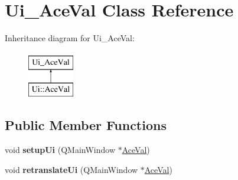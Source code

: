 \hypertarget{classUi__AceVal}{\section{Ui\-\_\-\-Ace\-Val Class Reference}
\label{classUi__AceVal}
}
Inheritance diagram for Ui\-\_\-\-Ace\-Val\-:\begin{figure}[H]
\begin{center}
\leavevmode
\includegraphics[height=2.000000cm]{classUi__AceVal}
\end{center}
\end{figure}
\subsection*{Public Member Functions}
\begin{DoxyCompactItemize}
\item 
\hypertarget{classUi__AceVal_a72f0d370e0d02783207d8dec4b1f9f11}{void {\bfseries setup\-Ui} (Q\-Main\-Window $\ast$\hyperlink{classAceVal}{Ace\-Val})}\label{classUi__AceVal_a72f0d370e0d02783207d8dec4b1f9f11}

\item 
\hypertarget{classUi__AceVal_a98089ae6994a12ccf66b540dde835b8e}{void {\bfseries retranslate\-Ui} (Q\-Main\-Window $\ast$\hyperlink{classAceVal}{Ace\-Val})}\label{classUi__AceVal_a98089ae6994a12ccf66b540dde835b8e}

\end{DoxyCompactItemize}
